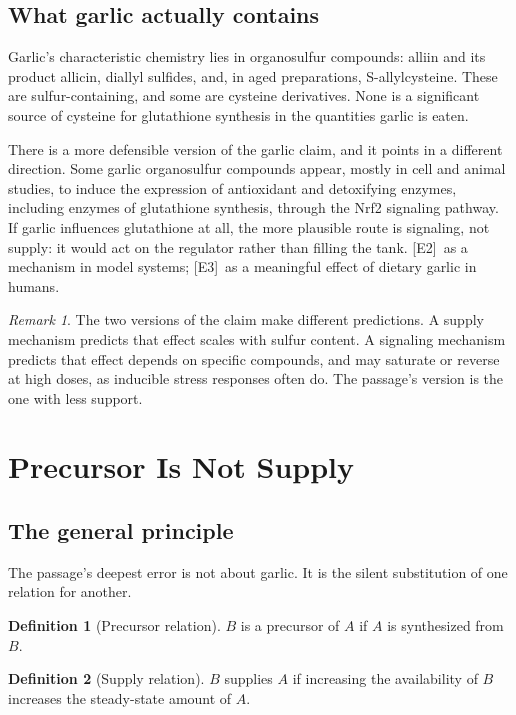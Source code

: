 \documentclass[11pt,a4paper]{article}
\theoremstyle{plain}
\theoremstyle{definition}
\newtheorem{definition}{Definition}
\theoremstyle{remark}
\newtheorem{remark}{Remark}
\newcommand{\tier}[1]{\textup{\textsc{[#1]}}}
\newcommand{\Etwo}{\tier{E2}}
\newcommand{\Ethree}{\tier{E3}}
\begin{document}
\subsection{What garlic actually contains}

Garlic's characteristic chemistry lies in organosulfur compounds: alliin and its product allicin, diallyl sulfides, and, in aged preparations, S-allylcysteine. These are sulfur-containing, and some are cysteine derivatives. None is a significant source of cysteine for glutathione synthesis in the quantities garlic is eaten.

There is a more defensible version of the garlic claim, and it points in a different direction. Some garlic organosulfur compounds appear, mostly in cell and animal studies, to induce the expression of antioxidant and detoxifying enzymes, including enzymes of glutathione synthesis, through the Nrf2 signaling pathway. If garlic influences glutathione at all, the more plausible route is signaling, not supply: it would act on the regulator rather than filling the tank. \Etwo\ as a mechanism in model systems; \Ethree\ as a meaningful effect of dietary garlic in humans.

\begin{remark}
The two versions of the claim make different predictions. A supply mechanism predicts that effect scales with sulfur content. A signaling mechanism predicts that effect depends on specific compounds, and may saturate or reverse at high doses, as inducible stress responses often do. The passage's version is the one with less support.
\end{remark}

\section{Precursor Is Not Supply}\label{sec:supply}

\subsection{The general principle}

The passage's deepest error is not about garlic. It is the silent substitution of one relation for another.

\begin{definition}[Precursor relation]
$B$ is a precursor of $A$ if $A$ is synthesized from $B$.
\end{definition}

\begin{definition}[Supply relation]
$B$ supplies $A$ if increasing the availability of $B$ increases the steady-state amount of $A$.
\end{definition}
\end{document}
